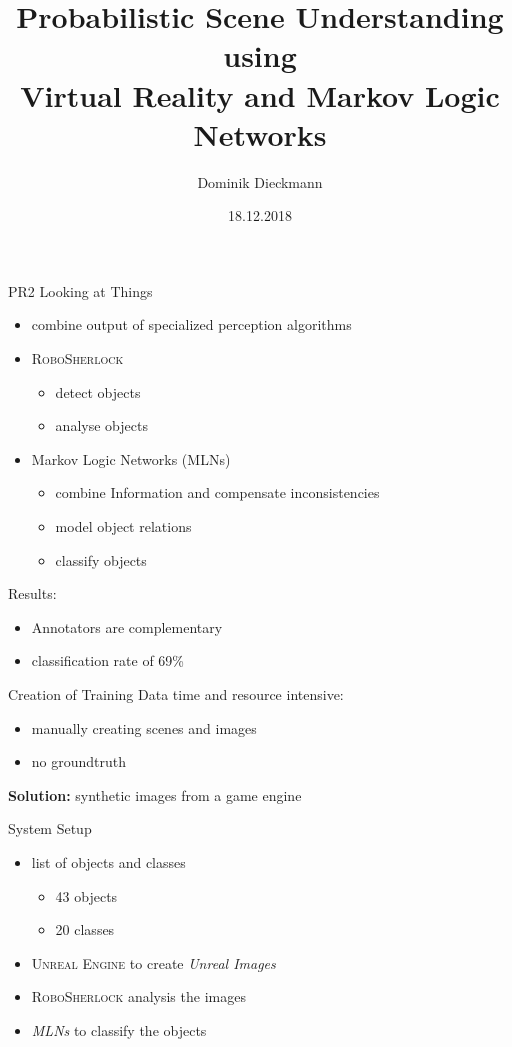 \documentclass[]{beamer}
\title[Short version]{Probabilistic Scene Understanding using\\ Virtual Reality and Markov Logic Networks}
\subtitle[]{}
\date[]{18.12.2018}
\author[D. Dieckmann]{Dominik Dieckmann}
\institute[Uni Bremen]{Institute for Artificial Intelligence \\ University Bremen}
\begin{document}
\beamertemplatenavigationsymbolsempty

\begin{frame}
	\maketitle
\end{frame}

\begin{frame}{PR2 Looking at Things}
	\begin{itemize}
		\item combine output of specialized perception algorithms 
		\item \textsc{RoboSherlock}
			\begin{itemize}
				\item detect objects
				\item analyse objects
			\end{itemize}
		\item Markov Logic Networks (MLNs)
			\begin{itemize}
				\item combine Information and compensate inconsistencies
				\item model object relations
				\item classify objects
			\end{itemize}
	\end{itemize}
	\bigskip
Results:
	\begin{itemize}
		\item Annotators are complementary
		\item classification rate of 69\%
	\end{itemize}
\end{frame}

\begin{frame}{Creation of Training Data}
time and resource intensive:
	\begin{itemize}
		\item manually creating scenes and images
		\item no groundtruth
	\end{itemize}
	\bigskip
\textbf{Solution:} synthetic images from a game engine
\end{frame}

\begin{frame}{System Setup}
	\begin{itemize}
		\item list of objects and classes
			\begin{itemize}
				\item 43 objects
				\item 20 classes
			\end{itemize}
		\item \textsc{Unreal Engine} to create \textit{Unreal Images}
		\item \textsc{RoboSherlock} analysis the images
		\item \textit{MLNs} to classify the objects
	\end{itemize}
\end{frame}
\end{document}
